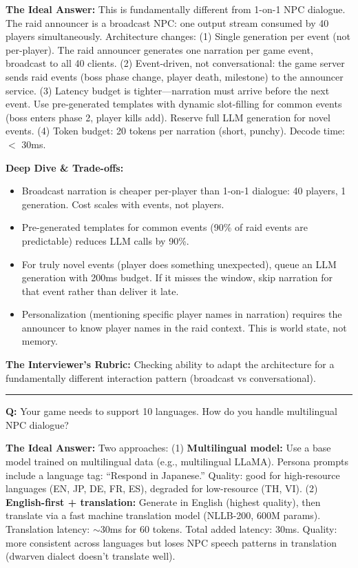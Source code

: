 \textbf{The Ideal Answer:} This is fundamentally different from 1-on-1 NPC dialogue. The raid announcer is a broadcast NPC: one output stream consumed by 40 players simultaneously. Architecture changes: (1) Single generation per event (not per-player). The raid announcer generates one narration per game event, broadcast to all 40 clients. (2) Event-driven, not conversational: the game server sends raid events (boss phase change, player death, milestone) to the announcer service. (3) Latency budget is tighter---narration must arrive before the next event. Use pre-generated templates with dynamic slot-filling for common events (boss enters phase 2, player kills add). Reserve full LLM generation for novel events. (4) Token budget: 20 tokens per narration (short, punchy). Decode time: $<$ 30ms.

\textbf{Deep Dive \& Trade-offs:}
\begin{itemize}
  \item Broadcast narration is cheaper per-player than 1-on-1 dialogue: 40 players, 1 generation. Cost scales with events, not players.
  \item Pre-generated templates for common events (90\% of raid events are predictable) reduces LLM calls by 90\%.
  \item For truly novel events (player does something unexpected), queue an LLM generation with 200ms budget. If it misses the window, skip narration for that event rather than deliver it late.
  \item Personalization (mentioning specific player names in narration) requires the announcer to know player names in the raid context. This is world state, not memory.
\end{itemize}

\textbf{The Interviewer's Rubric:} Checking ability to adapt the architecture for a fundamentally different interaction pattern (broadcast vs conversational).

\bigskip\hrule\bigskip

\textbf{Q:} Your game needs to support 10 languages. How do you handle multilingual NPC dialogue?

\textbf{The Ideal Answer:} Two approaches: (1) \textbf{Multilingual model:} Use a base model trained on multilingual data (e.g., multilingual LLaMA). Persona prompts include a language tag: ``Respond in Japanese.'' Quality: good for high-resource languages (EN, JP, DE, FR, ES), degraded for low-resource (TH, VI). (2) \textbf{English-first + translation:} Generate in English (highest quality), then translate via a fast machine translation model (NLLB-200, 600M params). Translation latency: $\sim$30ms for 60 tokens. Total added latency: 30ms. Quality: more consistent across languages but loses NPC speech patterns in translation (dwarven dialect doesn't translate well).


